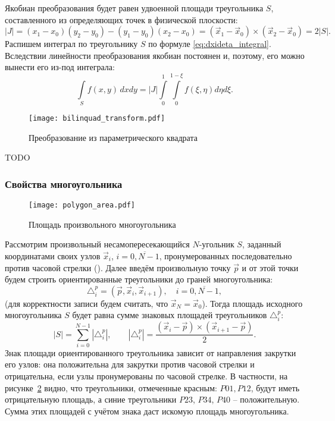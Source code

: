 Якобиан преобразования будет равен удвоенной площади треугольника $S$, составленного из определяющих точек в физической плоскости:
\begin{equation}
\label{eq:lintri_jacobian}
|J| = (x_1 - x_0) (y_2 - y_0) - (y_1 - y_0) (x_2 - x_0) = (\vec x_1 - \vec x_0) \times (\vec x_2 - \vec x_0) = 2 |S|.
\end{equation}
Распишем интеграл по треугольнику $S$ по формуле \cref{eq:dxideta_integral}.
Вследствии линейности преобразования якобиан постоянен и, поэтому, его можно вынести его из-под интеграла:
\begin{equation}
\label{eq:lintri_integral}
\int\limits_{S}f(x, y)\,dxdy = |J|\int\limits_0^1 \int\limits_0^{1-\xi} f(\xi, \eta) d\eta d\xi.
\end{equation}

\label{sec:bilinquad_transform}
\begin{figure}[h!]
\centering
\texttt{[image: bilinquad\_transform.pdf]}
\caption{Преобразование из параметрического квадрата}
\label{fig:bilinquad_transform}
\end{figure}

TODO

\subsubsection{Свойства многоугольника}
\label{sec:polygon_area} 

\begin{figure}[h!]
\centering
\texttt{[image: polygon\_area.pdf]}
\caption{Площадь произвольного многоугольника}
\label{fig:polygon_area}
\end{figure}

Рассмотрим произвольный несамопересекающийся $N$-угольник $S$,
заданный координатами своих узлов $\vec x_i$, $i=\overline{0, N-1}$,
пронумерованных последовательно против часовой стрелки ().
Далее введём произвольную точку $\vec p$ и 
от этой точки будем строить ориентированные треугольники до граней многоугольника:
$$
\triangle^p_i = (\vec p, \vec x_i, \vec x_{i+1}), \quad i=\overline{0, N-1},
$$
(для корректности записи будем считать, что $\vec x_N = \vec x_0$).
Тогда площадь исходного многоугольника $S$ будет равна сумме
знаковых площадей треугольников $\triangle^p_i$:
$$
|S| = \sum_{i=0}^{N-1} |\triangle^p_i|, \qquad |\triangle^p_i| = \frac{(\vec x_i - \vec p) \times (\vec x_{i+1} - \vec p)}{2}.
$$
Знак площади ориентированного треугольника зависит от направления закрутки его узлов:
она положительна для закрутки против часовой стрелки и отрицательна, если узлы пронумерованы по часовой стрелке.
В частности, на рисунке~\ref{fig:polygon_area} видно, что треугольники, отмеченные красным: $P01, P12$, будут
иметь отрицательную площадь, а синие треугольники $P23$, $P34$, $P40$ -- положительную. Сумма этих площадей
с учётом знака даст искомую площадь многоугольника.

